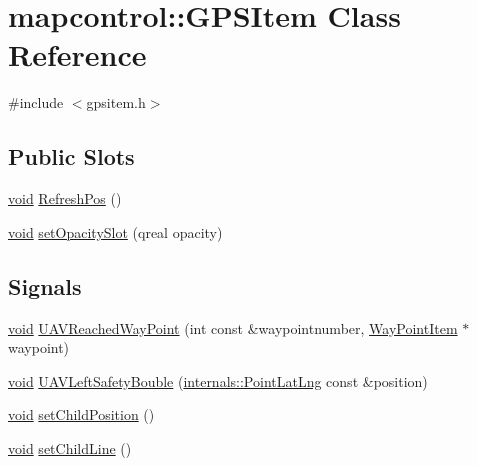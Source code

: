 \hypertarget{classmapcontrol_1_1_g_p_s_item}{\section{mapcontrol\-:\-:\-G\-P\-S\-Item \-Class \-Reference}
\label{classmapcontrol_1_1_g_p_s_item}
}


{\ttfamily \#include $<$gpsitem.\-h$>$}

\subsection*{\-Public \-Slots}
\begin{DoxyCompactItemize}
\item 
\hyperlink{group___u_a_v_objects_plugin_ga444cf2ff3f0ecbe028adce838d373f5c}{void} \hyperlink{group___o_p_map_widget_gab998fe4c6c60b16ae2caceafa1f08edc}{\-Refresh\-Pos} ()
\item 
\hyperlink{group___u_a_v_objects_plugin_ga444cf2ff3f0ecbe028adce838d373f5c}{void} \hyperlink{group___o_p_map_widget_ga877e61b6ded2fb2da63d23538e7bb089}{set\-Opacity\-Slot} (qreal opacity)
\end{DoxyCompactItemize}
\subsection*{\-Signals}
\begin{DoxyCompactItemize}
\item 
\hyperlink{group___u_a_v_objects_plugin_ga444cf2ff3f0ecbe028adce838d373f5c}{void} \hyperlink{group___o_p_map_widget_ga1631e3c57b806164009c3cf0b06bc32e}{\-U\-A\-V\-Reached\-Way\-Point} (int const \&waypointnumber, \hyperlink{classmapcontrol_1_1_way_point_item}{\-Way\-Point\-Item} $\ast$waypoint)
\item 
\hyperlink{group___u_a_v_objects_plugin_ga444cf2ff3f0ecbe028adce838d373f5c}{void} \hyperlink{group___o_p_map_widget_ga1ff02a44dc75d4a1e4b596c525cdd01c}{\-U\-A\-V\-Left\-Safety\-Bouble} (\hyperlink{structinternals_1_1_point_lat_lng}{internals\-::\-Point\-Lat\-Lng} const \&position)
\item 
\hyperlink{group___u_a_v_objects_plugin_ga444cf2ff3f0ecbe028adce838d373f5c}{void} \hyperlink{group___o_p_map_widget_ga049682502601e7325ec7d23d8a01bf5c}{set\-Child\-Position} ()
\item 
\hyperlink{group___u_a_v_objects_plugin_ga444cf2ff3f0ecbe028adce838d373f5c}{void} \hyperlink{group___o_p_map_widget_gab1b84f9c892548a9994f0e69cc0be466}{set\-Child\-Line} ()
\end{DoxyCompactItemize}



